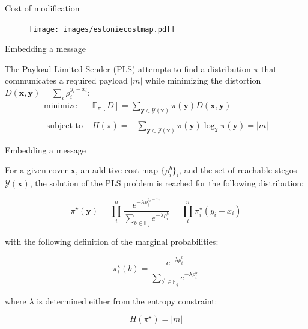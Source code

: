 \documentclass[10pt]{beamer}
\begin{document}
\begin{frame}{Cost of modification}
\begin{figure}[h]
\texttt{[image: images/estoniecostmap.pdf]}
\end{figure}
\end{frame}

\begin{frame}{Embedding a message}

\begin{tcolorbox}[colback=lightgreen,colframe=greentheme,title=\textbf{Definition} (The Payload-Limited Sender)]
The Payload-Limited Sender (PLS) attempts to find a distribution $\pi$ that communicates a required payload $|m|$ while minimizing the distortion $D(\mathbf{x},\mathbf{y}) = \sum_i \rho_i^{y_i - x_i}$:
\begin{equation}
\begin{array}{cc}
\operatorname{minimize} & \mathbb{E}_{\pi}[D]=\sum_{\mathbf{y} \in \mathcal{Y}(\mathbf{x})} \pi(\mathbf{y}) D(\mathbf{x}, \mathbf{y}) \\\\
 \mbox{ subject to } & H(\pi) = -\sum_{\mathbf{y} \in \mathcal{Y}(\mathbf{x})} \pi(\mathbf{y}) \log_{2} \pi(\mathbf{y}) =|m|
\end{array}
\end{equation}

\end{tcolorbox}

\end{frame}


\begin{frame}{Embedding a message}

\begin{tcolorbox}[colback=lightgreen,colframe=greentheme,title=\textbf{Theorem} (Optimal distribution w.r.t. distortion)]

For a given cover $\mathbf{x}$, an additive cost map $\{\rho_i^b\}_i$, and the set of reachable stegos $\mathcal{Y}(\mathbf{x})$, the solution of the PLS problem is reached for the following distribution:

\begin{equation}
\pi^{\star}(\mathbf{y})=\prod_{i}^{n} \frac{e^{-\lambda \rho_{i}^{y_{i}-x_{i}}}}{\sum_{b \in \mathbb{F}_{q}} e^{-\lambda \rho_{i}^{b}}}=\prod_{i}^{n} \pi_{i}^{\star}\left(y_{i}-x_{i}\right)
\end{equation}

with the following definition of the marginal probabilities:

\begin{equation}
\pi_{i}^{\star}(b)=\frac{e^{-\lambda \rho_{i}^{b}}}{\sum_{b^{\prime} \in \mathbb{F}_{q}} e^{-\lambda \rho_{i}^{b^{\prime}}}}
\end{equation}

where $\lambda$ is determined either from the entropy constraint:

\begin{equation}
H(\pi^{\star}) =|m|
\end{equation}

\end{tcolorbox}


\end{frame}
\end{document}
